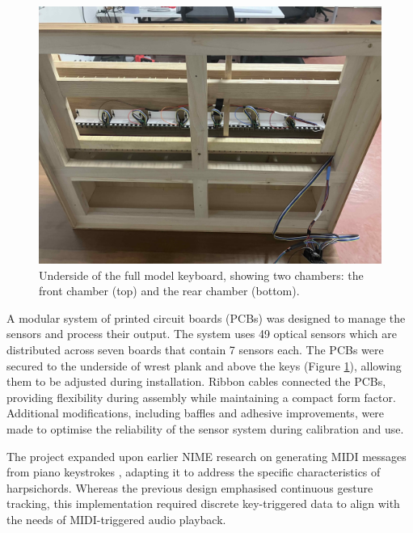 \begin{figure}
  \centering
  \includegraphics[width=\linewidth]{src/images/49-key-bottom-sensors-no-keys.jpg} 
  \caption{Underside of the full model keyboard, showing two chambers: the front chamber (top) and the rear chamber (bottom).} 
  \Description{} 
  \label{fig:49-key-bottom}
\end{figure}

A modular system of printed circuit boards (PCBs) was designed to manage the sensors and process their output. The system uses 49 optical sensors which are distributed across seven boards that contain 7 sensors each. The PCBs were secured to the underside of wrest plank and above the keys (Figure \ref{fig:49-key-bottom}), allowing them to be adjusted during installation. Ribbon cables connected the PCBs, providing flexibility during assembly while maintaining a compact form factor. Additional modifications, including baffles and adhesive improvements, were made to optimise the reliability of the sensor system during calibration and use.

The project expanded upon earlier NIME research on generating MIDI messages from piano keystrokes \cite{McPherson2013}, adapting it to address the specific characteristics of harpsichords. Whereas the previous design emphasised continuous gesture tracking, this implementation required discrete key-triggered data to align with the needs of MIDI-triggered audio playback. 

